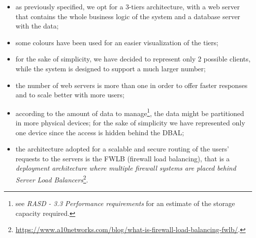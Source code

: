 \documentclass{article}
\begin{document}
\begin{itemize}
    \item as previously specified, we opt for a 3-tiers architecture, with a web server that contains the whole business logic of the system and a database server with the data;
    \item some colours have been used for an easier visualization of the tiers;
    \item for the sake of simplicity, we have decided to represent only 2 possible clients, while the system is designed to support a much larger number;
    \item the number of web servers is more than one in order to offer faster responses and to scale better with more users;
    \item according to the amount of data to manage\footnote{see \textit{RASD - 3.3 Performance requirements} for an estimate of the storage capacity required.}, the data might be partitioned in more physical devices; for the sake of simplicity we have represented only one device since the access is hidden behind the DBAL;
    \item the architecture adopted for a scalable and secure routing of the users' requests to the servers is the FWLB (firewall load balancing), that is a \textit{deployment architecture where multiple firewall systems are placed behind Server Load Balancers}\footnote{\url{https://www.a10networks.com/blog/what-is-firewall-load-balancing-fwlb/}.}.
\end{itemize}
\end{document}
